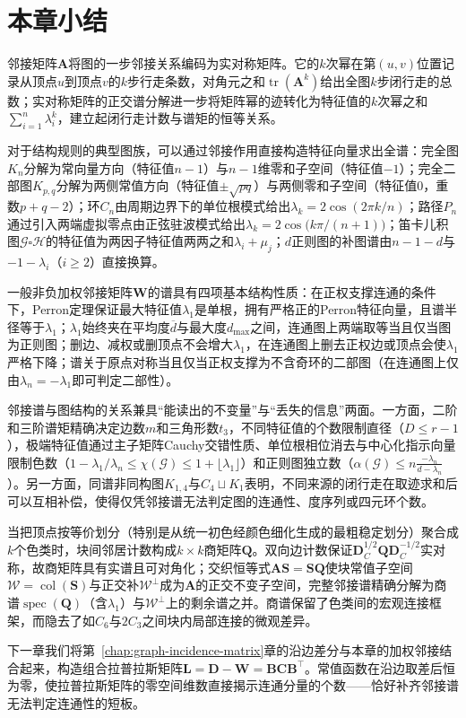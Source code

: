 \section{本章小结}
\label{sec:adjacency-matrix-summary}

邻接矩阵$\bm A$将图的一步邻接关系编码为实对称矩阵。它的$k$次幂在第$(u,v)$位置记录从顶点$u$到顶点$v$的$k$步行走条数，对角元之和$\operatorname{tr}(\bm A^k)$给出全图$k$步闭行走的总数；实对称矩阵的正交谱分解进一步将矩阵幂的迹转化为特征值的$k$次幂之和$\sum_{i=1}^n\lambda_i^k$，建立起闭行走计数与谱矩的恒等关系。

对于结构规则的典型图族，可以通过邻接作用直接构造特征向量求出全谱：完全图$K_n$分解为常向量方向（特征值$n-1$）与$n-1$维零和子空间（特征值$-1$）；完全二部图$K_{p,q}$分解为两侧常值方向（特征值$\pm\sqrt{pq}$）与两侧零和子空间（特征值$0$，重数$p+q-2$）；环$C_n$由周期边界下的单位根模式给出$\lambda_k=2\cos(2\pi k/n)$；路径$P_n$通过引入两端虚拟零点由正弦驻波模式给出$\lambda_k=2\cos\bigl(k\pi/(n+1)\bigr)$；笛卡儿积图$\mathcal G\square\mathcal H$的特征值为两因子特征值两两之和$\lambda_i+\mu_j$；$d$正则图的补图谱由$n-1-d$与$-1-\lambda_i$（$i\geq 2$）直接换算。

一般非负加权邻接矩阵$\bm W$的谱具有四项基本结构性质：在正权支撑连通的条件下，Perron定理保证最大特征值$\lambda_1$是单根，拥有严格正的Perron特征向量，且谱半径等于$\lambda_1$；$\lambda_1$始终夹在平均度$\overline d$与最大度$d_{\max}$之间，连通图上两端取等当且仅当图为正则图；删边、减权或删顶点不会增大$\lambda_1$，在连通图上删去正权边或顶点会使$\lambda_1$严格下降；谱关于原点对称当且仅当正权支撑为不含奇环的二部图（在连通图上仅由$\lambda_n=-\lambda_1$即可判定二部性）。

邻接谱与图结构的关系兼具“能读出的不变量”与“丢失的信息”两面。一方面，二阶和三阶谱矩精确决定边数$m$和三角形数$t_3$，不同特征值的个数限制直径（$D\leq r-1$），极端特征值通过主子矩阵Cauchy交错性质、单位根相位消去与中心化指示向量限制色数（$1-\lambda_1/\lambda_n\leq\chi(\mathcal G)\leq 1+\lfloor\lambda_1\rfloor$）和正则图独立数（$\alpha(\mathcal G)\leq n\frac{-\lambda_n}{d-\lambda_n}$）。另一方面，同谱非同构图$K_{1,4}$与$C_4\sqcup K_1$表明，不同来源的闭行走在取迹求和后可以互相补偿，使得仅凭邻接谱无法判定图的连通性、度序列或四元环个数。

当把顶点按等价划分（特别是从统一初色经颜色细化生成的最粗稳定划分）聚合成$k$个色类时，块间邻居计数构成$k\times k$商矩阵$\bm Q$。双向边计数保证$\bm D_C^{1/2}\bm Q\bm D_C^{-1/2}$实对称，故商矩阵具有实谱且可对角化；交织恒等式$\bm A\bm S=\bm S\bm Q$使块常值子空间$\mathcal W=\operatorname{col}(\bm S)$与正交补$\mathcal W^\perp$成为$\bm A$的正交不变子空间，完整邻接谱精确分解为商谱$\operatorname{spec}(\bm Q)$（含$\lambda_1$）与$\mathcal W^\perp$上的剩余谱之并。商谱保留了色类间的宏观连接框架，而隐去了如$C_6$与$2C_3$之间块内局部连接的微观差异。

下一章我们将第~\ref{chap:graph-incidence-matrix}章的沿边差分与本章的加权邻接结合起来，构造组合拉普拉斯矩阵$\bm L=\bm D-\bm W=\bm B\bm C\bm B^\top$。常值函数在沿边取差后恒为零，使拉普拉斯矩阵的零空间维数直接揭示连通分量的个数——恰好补齐邻接谱无法判定连通性的短板。
